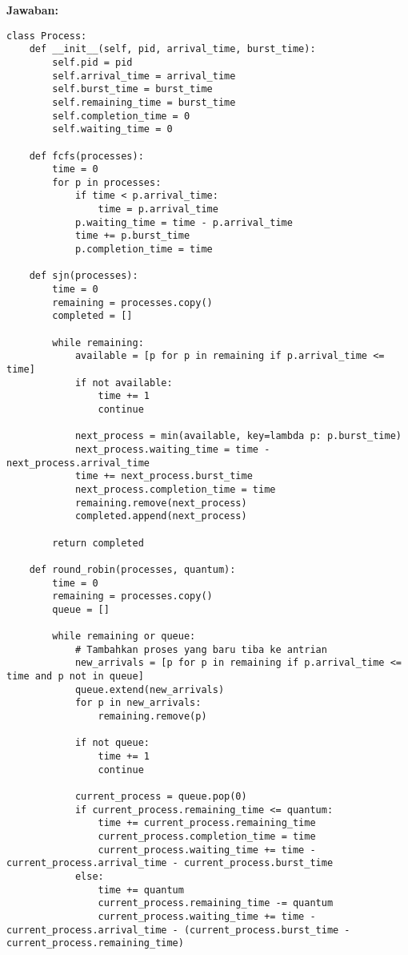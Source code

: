\documentclass[12pt]{article}
\begin{document}
\textbf{Jawaban:}
\begin{lstlisting}
class Process:
    def __init__(self, pid, arrival_time, burst_time):
        self.pid = pid
        self.arrival_time = arrival_time
        self.burst_time = burst_time
        self.remaining_time = burst_time
        self.completion_time = 0
        self.waiting_time = 0

    def fcfs(processes):
        time = 0
        for p in processes:
            if time < p.arrival_time:
                time = p.arrival_time
            p.waiting_time = time - p.arrival_time
            time += p.burst_time
            p.completion_time = time

    def sjn(processes):
        time = 0
        remaining = processes.copy()
        completed = []
        
        while remaining:
            available = [p for p in remaining if p.arrival_time <= time]
            if not available:
                time += 1
                continue
            
            next_process = min(available, key=lambda p: p.burst_time)
            next_process.waiting_time = time - next_process.arrival_time
            time += next_process.burst_time
            next_process.completion_time = time
            remaining.remove(next_process)
            completed.append(next_process)
        
        return completed

    def round_robin(processes, quantum):
        time = 0
        remaining = processes.copy()
        queue = []
        
        while remaining or queue:
            # Tambahkan proses yang baru tiba ke antrian
            new_arrivals = [p for p in remaining if p.arrival_time <= time and p not in queue]
            queue.extend(new_arrivals)
            for p in new_arrivals:
                remaining.remove(p)
            
            if not queue:
                time += 1
                continue
            
            current_process = queue.pop(0)
            if current_process.remaining_time <= quantum:
                time += current_process.remaining_time
                current_process.completion_time = time
                current_process.waiting_time += time - current_process.arrival_time - current_process.burst_time
            else:
                time += quantum
                current_process.remaining_time -= quantum
                current_process.waiting_time += time - current_process.arrival_time - (current_process.burst_time - current_process.remaining_time)
                

\end{lstlisting}
\end{document}
